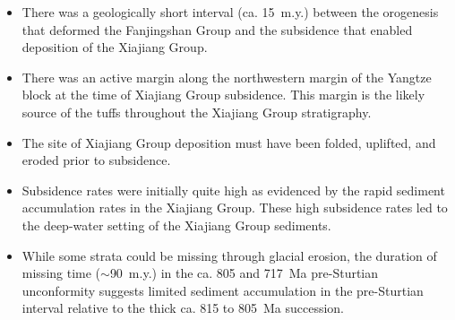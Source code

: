 \begin{itemize}
    \item There was a geologically short interval (ca. 15~m.y.) between the orogenesis that deformed the Fanjingshan Group and the subsidence that enabled deposition of the Xiajiang Group.
    \item There was an active margin along the northwestern margin of the Yangtze block at the time of Xiajiang Group subsidence. This margin is the likely source of the tuffs throughout the Xiajiang Group stratigraphy.
    \item The site of Xiajiang Group deposition must have been folded, uplifted, and eroded prior to subsidence.
    \item Subsidence rates were initially quite high as evidenced by the rapid sediment accumulation rates in the Xiajiang Group. These high subsidence rates led to the deep-water setting of the Xiajiang Group sediments.
    \item While some strata could be missing through glacial erosion, the duration of missing time ($\sim$90~m.y.) in the ca. 805 and 717~Ma pre-Sturtian unconformity suggests limited sediment accumulation in the pre-Sturtian interval relative to the thick ca. 815 to 805~Ma succession.
\end{itemize}

